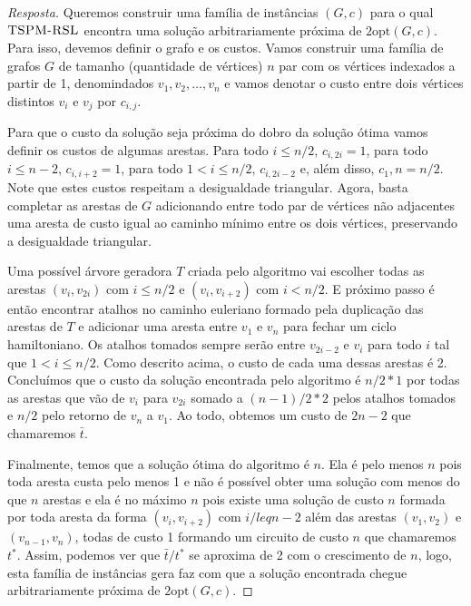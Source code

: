 \documentclass[12pt]{article}
\begin{document}
\begin{proof}[Resposta]
Queremos construir uma família de instâncias $(G,c)$ para o qual $\textsc{TSPM-RSL}$ encontra uma solução arbitrariamente próxima de $2\textrm{opt}(G,c)$. Para isso, devemos definir o grafo e os custos. Vamos construir uma família de grafos $G$ de tamanho (quantidade de vértices) $n$ par com os vértices indexados a partir de 1, denomindados $v_1, v_2, \dots, v_n$ e vamos denotar o custo entre dois vértices distintos $v_i$ e $v_j$ por $c_{i,j}$.   

Para que o custo da solução seja próxima do dobro da solução ótima vamos definir os custos de algumas arestas. Para todo $i \leq n/2$, $c_{i,2i} = 1$, para todo $i \leq n-2$, $c_{i,i+2} = 1$, para todo $1 < i \leq n/2$, $c_{i,2i-2}$ e, além disso, $c_1,n = n/2$. Note que estes custos respeitam a desigualdade triangular. Agora, basta completar as arestas de $G$ adicionando entre todo par de vértices não adjacentes uma aresta de custo igual ao caminho mínimo entre os dois vértices, preservando a desigualdade triangular.  

Uma possível árvore geradora $T$ criada pelo algoritmo vai escolher todas as arestas $(v_i, v_{2i})$ com $i \leq n/2$ e $(v_i, v_{i+2})$ com $i < n/2$. E próximo passo é então encontrar atalhos no caminho euleriano formado pela duplicação das arestas de $T$ e adicionar uma aresta entre $v_1$ e $v_n$ para fechar um ciclo hamiltoniano. Os atalhos tomados sempre serão entre $v_{2i-2}$ e $v_i$ para todo $i$ tal que $1 < i \leq n/2$. Como descrito acima, o custo de cada uma dessas arestas é 2. Concluímos que o custo da solução encontrada pelo algoritmo é $n/2 * 1$ por todas as arestas que vão de $v_i$ para $v_{2i}$ somado a $(n-1)/2 * 2$ pelos atalhos tomados e $n/2$ pelo retorno de $v_n$ a $v_1$. Ao todo, obtemos um custo de $2n-2$ que chamaremos $\bar{t}$.  

Finalmente, temos que a solução ótima do algoritmo é $n$. Ela é pelo menos $n$ pois toda aresta custa pelo menos 1 e não é possível obter uma solução com menos do que $n$ arestas e ela é no máximo $n$ pois existe uma solução de custo $n$ formada por toda aresta da forma $(v_i,v_{i+2})$ com $i /leq n-2$ além das arestas $(v_1,v_2)$ e $(v_{n-1},v_n)$, todas de custo 1 formando um circuito de custo $n$ que chamaremos $t^*$. Assim, podemos ver que $\bar{t}/t^*$ se aproxima de 2 com o crescimento de $n$, logo, esta família de instâncias gera faz com que a solução encontrada chegue arbitrariamente próxima de $2\textrm{opt}(G,c)$.  


\end{proof}
\end{document}
